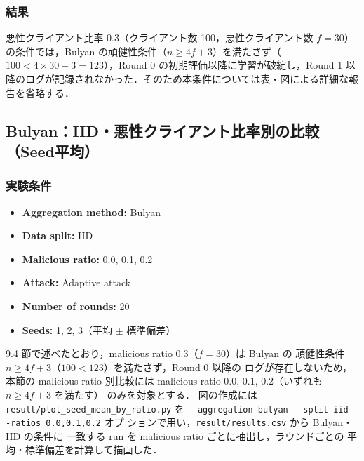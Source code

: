 \documentclass[a4j,twocolumn,dvipdfmx]{jsarticle}
\begin{document}
\subsubsection{結果}

悪性クライアント比率 0.3（クライアント数 100，悪性クライアント数 $f=30$）の条件では，Bulyan の頑健性条件（$n \geq 4f+3$）を満たさず（$100 < 4 \times 30 + 3 = 123$），Round 0 の初期評価以降に学習が破綻し，Round 1 以降のログが記録されなかった．そのため本条件については表・図による詳細な報告を省略する．

\clearpage
\subsection{Bulyan：IID・悪性クライアント比率別の比較（Seed平均）}

\subsubsection{実験条件}

\begin{itemize}
    \item \textbf{Aggregation method:} Bulyan
    \item \textbf{Data split:} IID
    \item \textbf{Malicious ratio:} 0.0, 0.1, 0.2
    \item \textbf{Attack:} Adaptive attack
    \item \textbf{Number of rounds:} 20
    \item \textbf{Seeds:} 1, 2, 3（平均 $\pm$ 標準偏差）
\end{itemize}

9.4 節で述べたとおり，malicious ratio 0.3（$f=30$）は Bulyan の
頑健性条件 $n \geq 4f+3$（$100 < 123$）を満たさず，Round 0 以降の
ログが存在しないため，本節の malicious ratio 別比較には
malicious ratio 0.0, 0.1, 0.2（いずれも $n \geq 4f+3$ を満たす）
のみを対象とする．
図の作成には \verb|result/plot_seed_mean_by_ratio.py| を
\verb|--aggregation bulyan --split iid --ratios 0.0,0.1,0.2| オプ
ションで用い，\verb|result/results.csv| から Bulyan・IID の条件に
一致する run を malicious ratio ごとに抽出し，ラウンドごとの
平均・標準偏差を計算して描画した．

\end{document}

